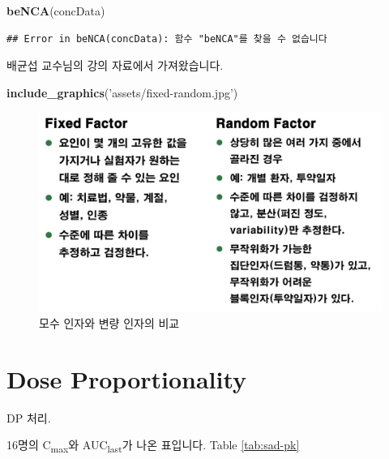 \documentclass[12pt,]{krantz}
\newenvironment{Shaded}{\begin{snugshade}}{\end{snugshade}}
\newcommand{\KeywordTok}[1]{\textcolor[rgb]{0.13,0.29,0.53}{\textbf{#1}}}
\newcommand{\StringTok}[1]{\textcolor[rgb]{0.31,0.60,0.02}{#1}}
\newcommand{\NormalTok}[1]{#1}
\theoremstyle{definition}
\theoremstyle{definition}
\theoremstyle{definition}
\theoremstyle{remark}
\begin{document}
\begin{Shaded}
\begin{Highlighting}[]
\KeywordTok{beNCA}\NormalTok{(concData)}
\end{Highlighting}
\end{Shaded}

\begin{verbatim}
## Error in beNCA(concData): 함수 "beNCA"를 찾을 수 없습니다
\end{verbatim}

배균섭 교수님의 강의 자료에서 가져왔습니다.

\begin{Shaded}
\begin{Highlighting}[]
\KeywordTok{include_graphics}\NormalTok{(}\StringTok{'assets/fixed-random.jpg'}\NormalTok{)}
\end{Highlighting}
\end{Shaded}

\begin{figure}
\includegraphics[width=16.86in]{assets/fixed-random} \caption{모수 인자와 변량 인자의 비교}\label{fig:fixedrandom}
\end{figure}

\section{Dose Proportionality}\label{dp}

DP 처리.

16명의 C\textsubscript{max}와 AUC\textsubscript{last}가 나온 표입니다.
Table \ref{tab:sad-pk}
\end{document}
